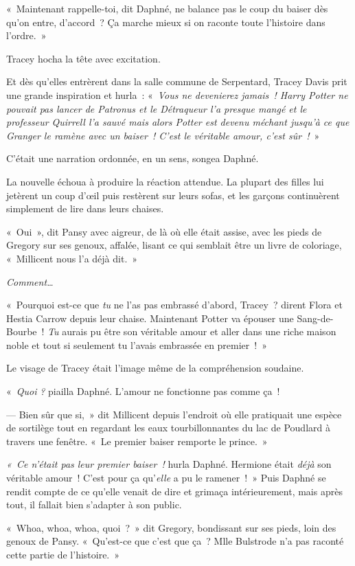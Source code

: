 «~Maintenant rappelle-toi, dit Daphné, ne balance pas le coup du baiser dès qu'on entre, d'accord~? Ça marche mieux si on raconte toute l'histoire dans l'ordre.~»

Tracey hocha la tête avec excitation.

Et dès qu'elles entrèrent dans la salle commune de Serpentard, Tracey Davis prit une grande inspiration et hurla~: «~\emph{Vous ne devenierez jamais~! Harry Potter ne pouvait pas lancer de Patronus et le Détraqueur l'a presque mangé et le professeur Quirrell l'a sauvé mais alors Potter est devenu méchant jusqu'à ce que Granger le ramène avec un baiser~! C'est le véritable amour, c'est sûr~!}~»

C'était une narration ordonnée, en un sens, songea Daphné.

La nouvelle échoua à produire la réaction attendue. La plupart des filles lui jetèrent un coup d'œil puis restèrent sur leurs sofas, et les garçons continuèrent simplement de lire dans leurs chaises.

«~Oui~», dit Pansy avec aigreur, de là où elle était assise, avec les pieds de Gregory sur ses genoux, affalée, lisant ce qui semblait être un livre de coloriage, «~Millicent nous l'a déjà dit.~»

\emph{Comment…}

«~Pourquoi est-ce que \emph{tu} ne l'as pas embrassé d'abord, Tracey~? dirent Flora et Hestia Carrow depuis leur chaise. Maintenant Potter va épouser une Sang-de-Bourbe~! \emph{Tu} aurais pu être son véritable amour et aller dans une riche maison noble et tout si seulement tu l'avais embrassée en premier~!~»

Le visage de Tracey était l'image même de la compréhension soudaine.

«~\emph{Quoi} \emph{?} piailla Daphné. L'amour ne fonctionne pas comme ça~!

--- Bien sûr que si,~» dit Millicent depuis l'endroit où elle pratiquait une espèce de sortilège tout en regardant les eaux tourbillonnantes du lac de Poudlard à travers une fenêtre. «~Le premier baiser remporte le prince.~»

\emph{«~Ce n'était pas leur premier baiser~!} hurla Daphné. Hermione était \emph{déjà} son véritable amour~! C'est pour ça qu'\emph{elle} a pu le ramener~!~» Puis Daphné se rendit compte de ce qu'elle venait de dire et grimaça intérieurement, mais après tout, il fallait bien s'adapter à son public.

«~Whoa, whoa, whoa, quoi~?~» dit Gregory, bondissant sur ses pieds, loin des genoux de Pansy. «~Qu'est-ce que c'est que ça~? Mlle Bulstrode n'a pas raconté cette partie de l'histoire.~»

